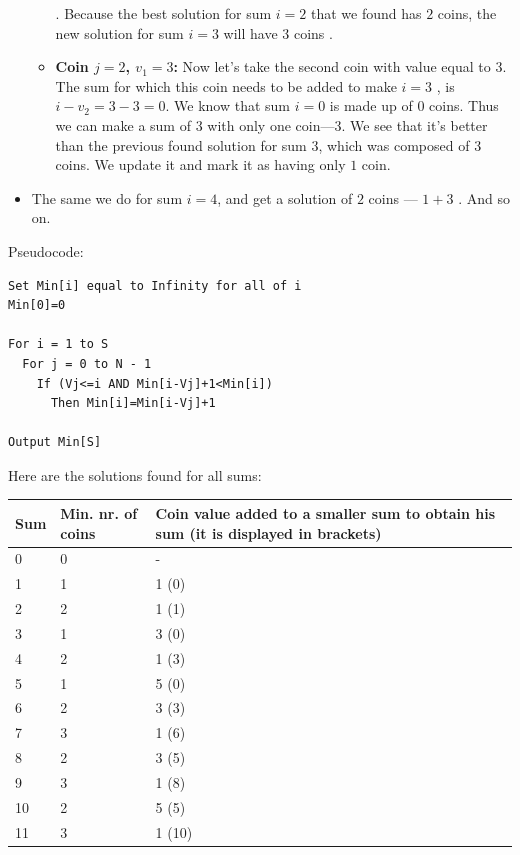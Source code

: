 \begin{itemize}
\begin{itemize}
    .  Because the best solution for sum $i=2$ that we found
    has $2$ coins, the new solution for sum $i=3$ will have $3$ coins
    .
  \item \textbf{Coin $j=2$, $v_1=3$:} Now let's take the second coin with
    value equal to $3$. The sum for which this coin needs to be added to
    make $i=3$ , is $i-v_2=3-3=0$. We know that sum $i=0$ is made up of $0$
    coins. Thus we can make a sum of $3$ with only one coin---$3$. We see
    that it's better than the previous found solution for sum $3$, which was
    composed of $3$ coins. We update it and mark it as having only $1$ coin.
  \end{itemize}
\item The same we do for sum $i=4$, and get a solution of $2$ coins ---
  $1+3$ . And so on.
\end{itemize}

Pseudocode:
\begin{lstlisting}[style=pseudostyle]
Set Min[i] equal to Infinity for all of i
Min[0]=0

For i = 1 to S
  For j = 0 to N - 1
    If (Vj<=i AND Min[i-Vj]+1<Min[i])
      Then Min[i]=Min[i-Vj]+1

Output Min[S]
\end{lstlisting}

Here are the solutions found for all sums:

\begingroup
\renewcommand*{\arraystretch}{\arraystretchsize}
\begin{footnotesize}
\begin{longtable}{|l|p{2.5cm}|p{9cm}|}
\hline
\endfirsthead
\hline
\endlastfoot
Sum &Min. nr. of coins&Coin value added to a smaller sum to obtain his sum
(it is displayed in brackets)\\\hline
0&0&-\\\hline
1&1&1 (0)\\\hline
2&2&1 (1)\\\hline
3&1&3 (0)\\\hline
4&2&1 (3)\\\hline
5&1&5 (0)\\\hline
6&2&3 (3)\\\hline
7&3&1 (6)\\\hline
8&2&3 (5)\\\hline
9&3&1 (8)\\\hline
10&2&5 (5)\\\hline
11&3&1 (10)\\
\end{longtable}
\end{footnotesize}
\endgroup

